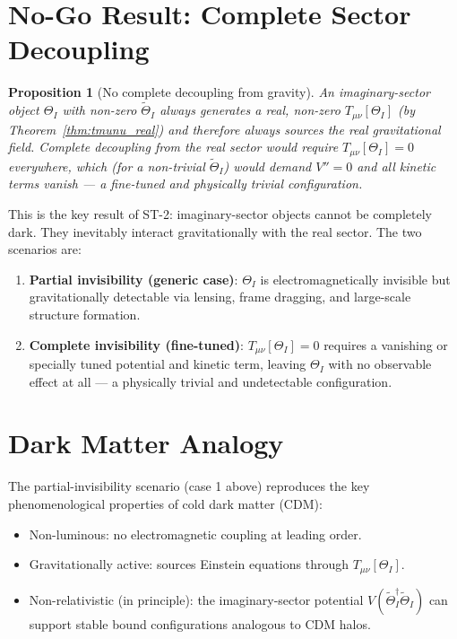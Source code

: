 \documentclass[12pt]{article}
\newtheorem{proposition}{Proposition}
\begin{document}
\section{No-Go Result: Complete Sector Decoupling}

\begin{proposition}[No complete decoupling from gravity]
\label{prop:no_decoupling}
An imaginary-sector object $\Theta_I$ with non-zero $\widetilde\Theta_I$
always generates a real, non-zero $T_{\mu\nu}[\Theta_I]$ (by
Theorem~\ref{thm:tmunu_real}) and therefore always sources the
real gravitational field.  Complete decoupling from the real sector
would require $T_{\mu\nu}[\Theta_I] = 0$ everywhere, which (for a
non-trivial $\widetilde\Theta_I$) would demand $V'' = 0$ and all
kinetic terms vanish — a fine-tuned and physically trivial configuration.
\end{proposition}

This is the key result of ST-2: imaginary-sector objects cannot be
completely dark.  They inevitably interact gravitationally with the
real sector.  The two scenarios are:
\begin{enumerate}
  \item \textbf{Partial invisibility (generic case)}: $\Theta_I$
    is electromagnetically invisible but gravitationally detectable
    via lensing, frame dragging, and large-scale structure formation.
  \item \textbf{Complete invisibility (fine-tuned)}: $T_{\mu\nu}[\Theta_I] = 0$
    requires a vanishing or specially tuned potential and kinetic term,
    leaving $\Theta_I$ with no observable effect at all —
    a physically trivial and undetectable configuration.
\end{enumerate}

\section{Dark Matter Analogy}

The partial-invisibility scenario (case 1 above) reproduces the
key phenomenological properties of cold dark matter (CDM):
\begin{itemize}
  \item Non-luminous: no electromagnetic coupling at leading order.
  \item Gravitationally active: sources Einstein equations through
    $T_{\mu\nu}[\Theta_I]$.
  \item Non-relativistic (in principle): the imaginary-sector potential
    $V(\widetilde\Theta_I^\dagger\widetilde\Theta_I)$ can support
    stable bound configurations analogous to CDM halos.
\end{itemize}
\end{document}
